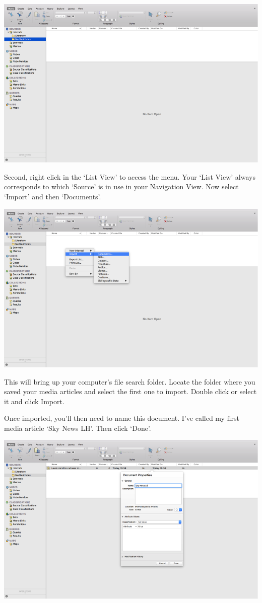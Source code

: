 \documentclass[]{book}
\theoremstyle{definition}
\theoremstyle{definition}
\theoremstyle{definition}
\theoremstyle{remark}
\begin{document}
\includegraphics{imgs/qual_13.png}

Second, right click in the `List View' to access the menu. Your `List
View' always corresponds to which `Source' is in use in your Navigation
View. Now select `Import' and then `Documents'.

\includegraphics{imgs/qual_14.png}

This will bring up your computer's file search folder. Locate the folder
where you saved your media articles and select the first one to import.
Double click or select it and click Import.

Once imported, you'll then need to name this document. I've called my
first media article `Sky News LH'. Then click `Done'.

\includegraphics{imgs/qual_15.png}
\end{document}
